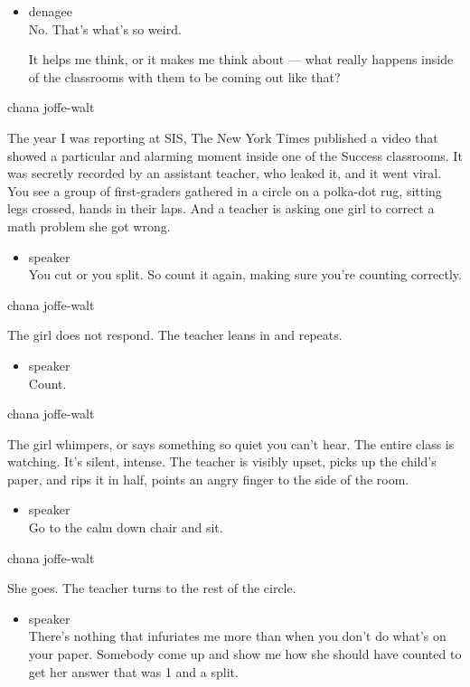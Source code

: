\begin{itemize}
\item
  denagee\\
  No. That's what's so weird.

  It helps me think, or it makes me think about --- what really happens
  inside of the classrooms with them to be coming out like that?
\end{itemize}

chana joffe-walt

The year I was reporting at SIS, The New York Times published a video
that showed a particular and alarming moment inside one of the Success
classrooms. It was secretly recorded by an assistant teacher, who leaked
it, and it went viral. You see a group of first-graders gathered in a
circle on a polka-dot rug, sitting legs crossed, hands in their laps.
And a teacher is asking one girl to correct a math problem she got
wrong.

\begin{itemize}
\tightlist
\item
  speaker\\
  You cut or you split. So count it again, making sure you're counting
  correctly.
\end{itemize}

chana joffe-walt

The girl does not respond. The teacher leans in and repeats.

\begin{itemize}
\tightlist
\item
  speaker\\
  Count.
\end{itemize}

chana joffe-walt

The girl whimpers, or says something so quiet you can't hear. The entire
class is watching. It's silent, intense. The teacher is visibly upset,
picks up the child's paper, and rips it in half, points an angry finger
to the side of the room.

\begin{itemize}
\tightlist
\item
  speaker\\
  Go to the calm down chair and sit.
\end{itemize}

chana joffe-walt

She goes. The teacher turns to the rest of the circle.

\begin{itemize}
\tightlist
\item
  speaker\\
  There's nothing that infuriates me more than when you don't do what's
  on your paper. Somebody come up and show me how she should have
  counted to get her answer that was 1 and a split.
\end{itemize}

